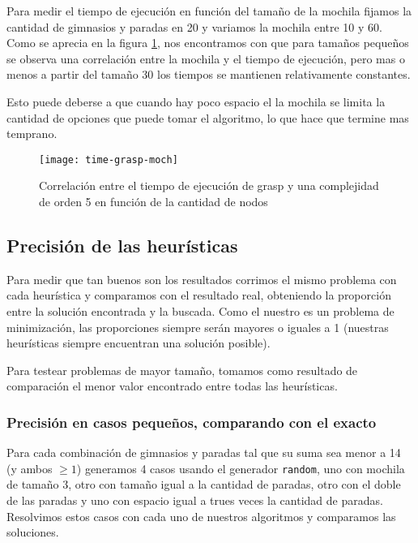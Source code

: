 Para medir el tiempo de ejecución en función del tamaño de la mochila fijamos la cantidad de gimnasios y paradas en 20 y variamos la mochila entre 10 y 60. Como se aprecia en la figura \ref{fig:time-grasp-moch}, nos encontramos con que para tamaños pequeños se observa una correlación entre la mochila y el tiempo de ejecución, pero mas o menos a partir del tamaño 30 los tiempos se mantienen relativamente constantes.

Esto puede deberse a que cuando hay poco espacio el la mochila se limita la cantidad de opciones que puede tomar el algoritmo, lo que hace que termine mas temprano.

\begin{figure}[H]
    \centering
    \texttt{[image: time-grasp-moch]}
    \caption{Correlación entre el tiempo de ejecución de grasp y una complejidad de orden 5 en función de la cantidad de nodos}
    \label{fig:time-grasp-moch}
\end{figure}

\subsection{Precisión de las heurísticas}

Para medir que tan buenos son los resultados corrimos el mismo problema con cada heurística y comparamos con el resultado real,
obteniendo la proporción entre la solución encontrada y la buscada. Como el nuestro es un problema de minimización,
las proporciones siempre serán mayores o iguales a 1 (nuestras heurísticas siempre encuentran una solución posible).

Para testear problemas de mayor tamaño, tomamos como resultado de comparación el menor valor encontrado entre todas las heurísticas.

\subsubsection{Precisión en casos pequeños, comparando con el exacto}
\label{sec:precision-small}

Para cada combinación de gimnasios y paradas tal que su suma sea menor a 14 (y ambos $\geq 1$) generamos 4 casos usando el generador \texttt{random},
uno con mochila de tamaño 3, otro con tamaño igual a la cantidad de paradas, otro con el doble de las paradas
y uno con espacio igual a trues veces la cantidad de paradas.
Resolvimos estos casos con cada uno de nuestros algoritmos y comparamos las soluciones.

